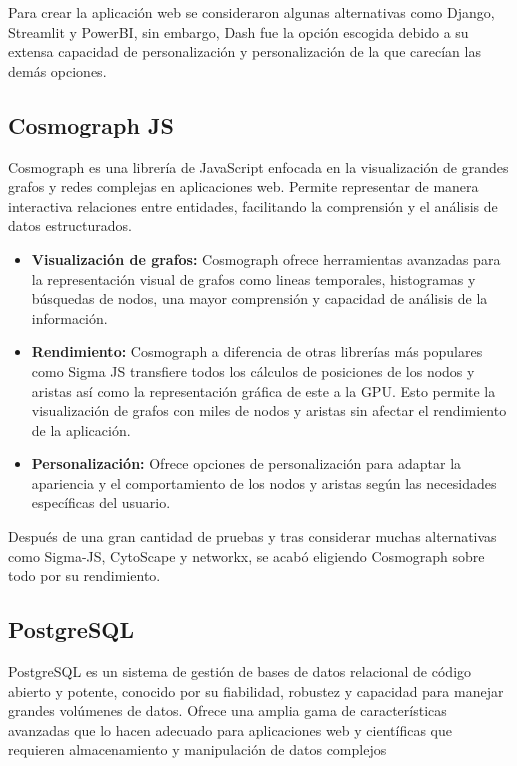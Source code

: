 \noindent Para crear la aplicación web se consideraron algunas alternativas como Django, Streamlit y PowerBI, sin embargo, Dash fue la opción escogida debido a su extensa capacidad de personalización y personalización de la que carecían las demás opciones.

\subsection{Cosmograph JS}

Cosmograph es una librería de JavaScript enfocada en la visualización de grandes grafos y redes complejas en aplicaciones web. Permite representar de manera interactiva relaciones entre entidades, facilitando la comprensión y el análisis de datos estructurados.

\begin{itemize}
	\item \textbf{Visualización de grafos:} Cosmograph ofrece herramientas avanzadas para la representación visual de grafos como lineas temporales, histogramas y búsquedas de nodos, una mayor comprensión y capacidad de análisis de la información.

	\item \textbf{Rendimiento:} Cosmograph a diferencia de otras librerías más populares como Sigma JS transfiere todos los cálculos de posiciones de los nodos y aristas así como la representación gráfica de este a la GPU. Esto permite la visualización de grafos con miles de nodos y aristas sin afectar el rendimiento de la aplicación.

	\item \textbf{Personalización:} Ofrece opciones de personalización para adaptar la apariencia y el comportamiento de los nodos y aristas según las necesidades específicas del usuario.

\end{itemize}

\noindent Después de una gran cantidad de pruebas y tras considerar muchas alternativas como Sigma-JS, CytoScape y networkx, se acabó eligiendo Cosmograph sobre todo por su rendimiento.

\subsection{PostgreSQL}

PostgreSQL es un sistema de gestión de bases de datos relacional de código abierto y potente, conocido por su fiabilidad, robustez y capacidad para manejar grandes volúmenes de datos. Ofrece una amplia gama de características avanzadas que lo hacen adecuado para aplicaciones web y científicas que requieren almacenamiento y manipulación de datos complejos

